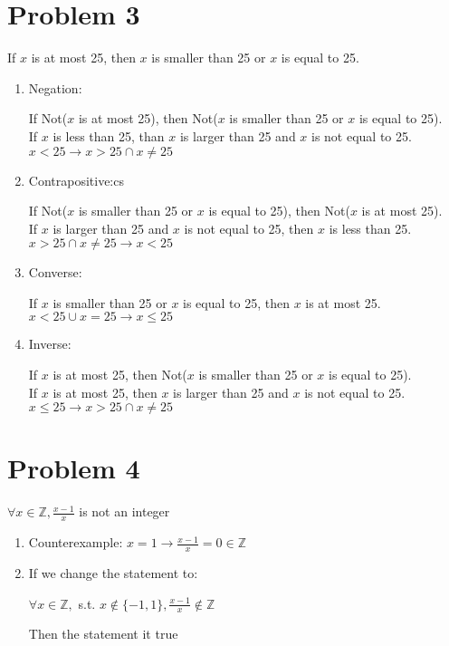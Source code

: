 \documentclass[11pt]{article}
\begin{document}
\section*{Problem 3}
\begin{center}
    If $x$ is at most 25, then $x$ is smaller than 25 or $x$ is equal to 25.
\end{center}
\begin{enumerate}
    \item Negation:
    \begin{center}
    If Not($x$ is at most 25), then Not($x$ is smaller than 25 or $x$ is equal to 25).\\
    If $x$ is less than 25, than $x$ is larger than 25 and $x$ is not equal to 25.\\
    $x < 25 \rightarrow x > 25 \cap x \neq 25$
    \end{center}
    \item Contrapositive:cs
    \begin{center}
        If Not($x$ is smaller than 25 or $x$ is equal to 25), then Not($x$ is at most 25).\\
        If $x$ is larger than 25 and $x$ is not equal to 25, then $x$ is less than 25.\\
        $x > 25 \cap x \neq 25 \rightarrow x < 25$
    \end{center}
    \item Converse:
    \begin{center}
      If $x$ is smaller than 25 or $x$ is equal to 25, then $x$ is at most 25.\\
      $x< 25 \cup x = 25 \rightarrow x \leq 25$
    \end{center}
    \item Inverse:
    \begin{center}
        If $x$ is at most 25, then Not($x$ is smaller than 25 or $x$ is equal to 25).\\
        If $x$ is at most 25, then $x$ is larger than 25 and $x$ is not equal to 25.\\
        $x \leq 25 \rightarrow x > 25 \cap x \neq 25$
    \end{center}

\end{enumerate}

\newpage

\section*{Problem 4}
\begin{center}
    $\forall x \in \mathbb{Z}, \frac{x-1}{x}$ is not an integer
\end{center}
\begin{enumerate}
    \item Counterexample: $x = 1 \rightarrow \frac{x-1}{x} = 0 \in \mathbb{Z}$
    \item If we change the statement to:
    \begin{center}
        $\forall x \in \mathbb{Z},$ s.t. $x \notin \{-1, 1\}, \frac{x-1}{x}\notin \mathbb{Z}$
    \end{center}
    Then the statement it true
\end{enumerate}
\end{document}
